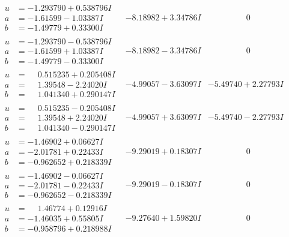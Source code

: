 \documentclass[1p]{elsarticle_modified}
\theoremstyle{definition}
\begin{document}
$$\begin{array}{c|c|c}
\begin{aligned}
u &= -1.293790 + 0.538796 I \\
a &= -1.61599 - 1.03387 I \\
b &= -1.49779 + 0.33300 I\end{aligned}
 & -8.18982 + 3.34786 I & \phantom{-0.000000 } 0 \\ \hline\begin{aligned}
u &= -1.293790 - 0.538796 I \\
a &= -1.61599 + 1.03387 I \\
b &= -1.49779 - 0.33300 I\end{aligned}
 & -8.18982 - 3.34786 I & \phantom{-0.000000 } 0 \\ \hline\begin{aligned}
u &= \phantom{-}0.515235 + 0.205408 I \\
a &= \phantom{-}1.39548 - 2.24020 I \\
b &= \phantom{-}1.041340 + 0.290147 I\end{aligned}
 & -4.99057 - 3.63097 I & -5.49740 + 2.27793 I \\ \hline\begin{aligned}
u &= \phantom{-}0.515235 - 0.205408 I \\
a &= \phantom{-}1.39548 + 2.24020 I \\
b &= \phantom{-}1.041340 - 0.290147 I\end{aligned}
 & -4.99057 + 3.63097 I & -5.49740 - 2.27793 I \\ \hline\begin{aligned}
u &= -1.46902 + 0.06627 I \\
a &= -2.01781 + 0.22433 I \\
b &= -0.962652 + 0.218339 I\end{aligned}
 & -9.29019 + 0.18307 I & \phantom{-0.000000 } 0 \\ \hline\begin{aligned}
u &= -1.46902 - 0.06627 I \\
a &= -2.01781 - 0.22433 I \\
b &= -0.962652 - 0.218339 I\end{aligned}
 & -9.29019 - 0.18307 I & \phantom{-0.000000 } 0 \\ \hline\begin{aligned}
u &= \phantom{-}1.46774 + 0.12916 I \\
a &= -1.46035 + 0.55805 I \\
b &= -0.958796 + 0.218988 I\end{aligned}
 & -9.27640 + 1.59820 I & \phantom{-0.000000 } 0\\

\end{array}$$
\end{document}
